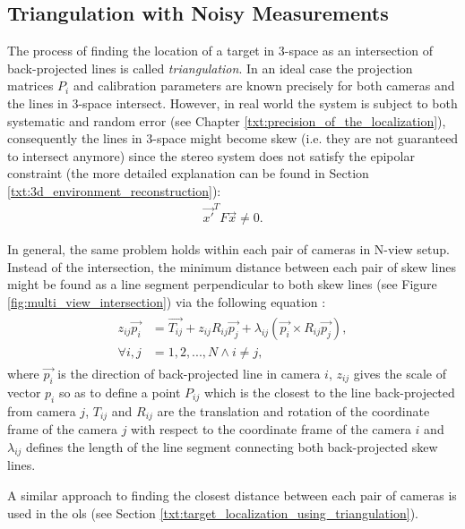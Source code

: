 \subsection{Triangulation with Noisy Measurements} \label{txt:triangulation_with_noisy_measurements}

The process of finding the location of a target in 3-space as an intersection of back-projected lines is called \textit{triangulation}. In an ideal case the projection matrices $P_{i}$ and calibration parameters are known precisely for both cameras and the lines in 3-space intersect. However, in real world the system is subject to both systematic and random error (see Chapter \ref{txt:precision_of_the_localization}), consequently the lines in 3-space might become skew (i.e. they are not guaranteed to intersect anymore) since the stereo system does not satisfy the epipolar constraint \cite{Hartley:2003:MVG:861369} (the more detailed explanation can be found in Section \ref{txt:3d_environment_reconstruction}):
\begin{align}
	\vec{x'}^{T}F\vec{x} \neq 0.
\end{align}

In general, the same problem holds within each pair of cameras in N-view setup. Instead of the intersection, the minimum distance between each pair of skew lines might be found as a line segment perpendicular to both skew lines (see Figure \ref{fig:multi_view_intersection}) via the following equation \cite{Forsyth:2002:CVM:580035}:
\begin{align}
\begin{split}
	z_{ij}\vec{p_{i}} &= \vec{T_{ij}} + z_{ij}R_{ij}\vec{p_{j}} + \lambda_{ij}(\vec{p_{i}} \times R_{ij}\vec{p_{j}}),\\
	\forall i,j           &= 1,2,...,N \land i \neq j,
\end{split}
\end{align}
where $\vec{p_{i}}$ is the direction of back-projected line in camera $i$, $z_{ij}$ gives the scale of vector ${p_{i}}$ so as to define a point $P_{ij}$ which is the closest to the line back-projected from camera $j$, $T_{ij}$ and $R_{ij}$ are the translation and rotation of the coordinate frame of the camera $j$ with respect to the coordinate frame of the camera $i$ and $\lambda_{ij}$ defines the length of the line segment connecting both back-projected skew lines.

A similar approach to finding the closest distance between each pair of cameras is used in the \gls{ols} (see Section \ref{txt:target_localization_using_triangulation}).

